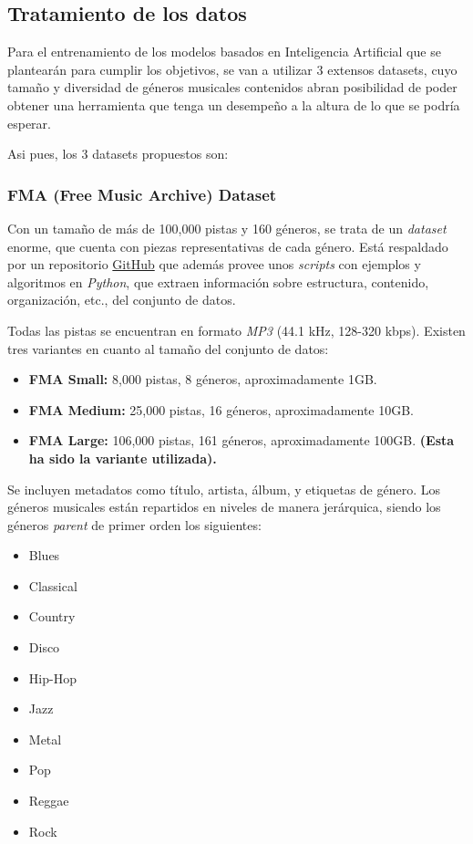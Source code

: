 \subsection{Tratamiento de los datos}

Para el entrenamiento de los modelos basados en Inteligencia Artificial que se plantearán para cumplir los objetivos, se van a utilizar 3 extensos datasets, cuyo tamaño y diversidad de géneros musicales contenidos abran posibilidad de poder obtener una herramienta que tenga un desempeño a la altura de lo que se podría esperar.

Asi pues, los 3 datasets propuestos son:

\subsubsection{FMA (Free Music Archive) Dataset}

Con un tamaño de más de 100,000 pistas y 160 géneros, se trata de un \emph{dataset} enorme, que cuenta con piezas representativas de cada género. Está respaldado por un repositorio \href{https://github.com/mdeff/fma}{GitHub} que además provee unos \emph{scripts} con ejemplos y algoritmos en \emph{Python}, que extraen información sobre estructura, contenido, organización, etc., del conjunto de datos.

Todas las pistas se encuentran en formato \emph{MP3} (44.1 kHz, 128-320 kbps). Existen tres variantes en cuanto al tamaño del conjunto de datos:

\begin{itemize}
    \item \textbf{FMA Small:} 8,000 pistas, 8 géneros, aproximadamente 1GB.
    \item \textbf{FMA Medium:} 25,000 pistas, 16 géneros, aproximadamente 10GB.
    \item \textbf{FMA Large:} 106,000 pistas, 161 géneros, aproximadamente 100GB. \textbf{(Esta ha sido la variante utilizada).}
\end{itemize}

Se incluyen metadatos como título, artista, álbum, y etiquetas de género. Los géneros musicales están repartidos en niveles de manera jerárquica, siendo los géneros \emph{parent} de primer orden los siguientes:

\begin{multicols}{4}
\begin{itemize}
    \item Blues
    \item Classical
    \item Country
    \item Disco
    \item Hip-Hop
    \item Jazz
    \item Metal
    \item Pop
    \item Reggae
    \item Rock
\end{itemize}
\end{multicols}

